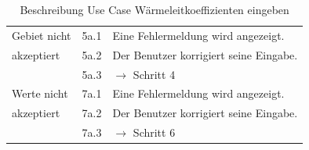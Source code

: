 \begin{table} [H]
\begin{tabular}{|l|l|l|}
		\hline
		Gebiet nicht & 5a.1 & Eine Fehlermeldung wird angezeigt.\\
		\cline{2-3}
		akzeptiert 	& 5a.2	& Der Benutzer korrigiert seine Eingabe.\\
		\cline{2-3}
					& 5a.3 	& $\rightarrow$ Schritt 4\\
		\hline
		Werte nicht & 7a.1 	& Eine Fehlermeldung wird angezeigt.\\
		\cline{2-3}
		akzeptiert 	& 7a.2	& Der Benutzer korrigiert seine Eingabe.\\
		\cline{2-3}
					& 7a.3 	& $\rightarrow$ Schritt 6\\
		\hline
	\end{tabular}
	\caption{Beschreibung Use Case Wärmeleitkoeffizienten eingeben}
	\label{Beschreibung Use Case Wärmeleitkoeffizienten eingeben}
\end{table}

